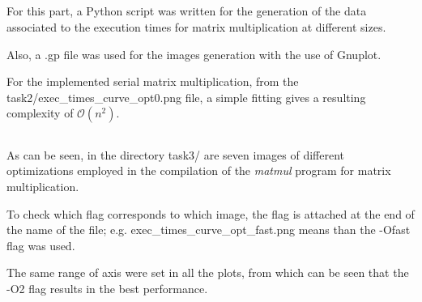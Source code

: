 \documentclass[paper=a4, fontsize=11pt]{scrartcl} %
\numberwithin{equation}{section} %
\numberwithin{figure}{section} %
\numberwithin{table}{section} %
\begin{document}
\subsection{\textbf{}}


For this part, a Python script was written for the generation of the data associated to the execution times for matrix multiplication at different sizes.

Also, a .gp file was used for the images generation with the use of Gnuplot.

For the implemented serial matrix multiplication, from the task2/exec\_times\_curve\_opt0.png file, a simple fitting gives a resulting complexity of $\mathcal{O}(n^{2})$.


\subsection{\textbf{}}


As can be seen, in the directory task3/ are seven images of different optimizations employed in the compilation of the \textit{matmul} program for matrix multiplication.

To check which flag corresponds to which image, the flag is attached at the end of the name of the file; e.g. exec\_times\_curve\_opt\_fast.png means than the -Ofast flag was used.

The same range of axis were set in all the plots, from which can be seen that the -O2 flag results in the best performance.
\end{document}
